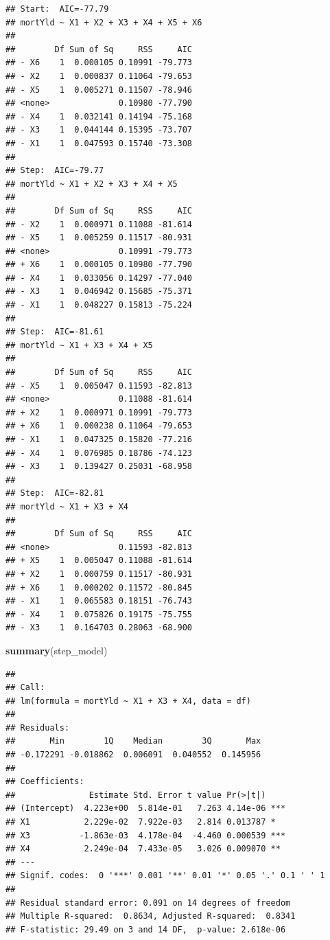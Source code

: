 \documentclass[
  12pt,
]{article}
\newenvironment{Shaded}{\begin{snugshade}}{\end{snugshade}}
\newcommand{\FunctionTok}[1]{\textcolor[rgb]{0.13,0.29,0.53}{\textbf{#1}}}
\newcommand{\NormalTok}[1]{#1}
\begin{document}
\begin{verbatim}
## Start:  AIC=-77.79
## mortYld ~ X1 + X2 + X3 + X4 + X5 + X6
## 
##        Df Sum of Sq     RSS     AIC
## - X6    1  0.000105 0.10991 -79.773
## - X2    1  0.000837 0.11064 -79.653
## - X5    1  0.005271 0.11507 -78.946
## <none>              0.10980 -77.790
## - X4    1  0.032141 0.14194 -75.168
## - X3    1  0.044144 0.15395 -73.707
## - X1    1  0.047593 0.15740 -73.308
## 
## Step:  AIC=-79.77
## mortYld ~ X1 + X2 + X3 + X4 + X5
## 
##        Df Sum of Sq     RSS     AIC
## - X2    1  0.000971 0.11088 -81.614
## - X5    1  0.005259 0.11517 -80.931
## <none>              0.10991 -79.773
## + X6    1  0.000105 0.10980 -77.790
## - X4    1  0.033056 0.14297 -77.040
## - X3    1  0.046942 0.15685 -75.371
## - X1    1  0.048227 0.15813 -75.224
## 
## Step:  AIC=-81.61
## mortYld ~ X1 + X3 + X4 + X5
## 
##        Df Sum of Sq     RSS     AIC
## - X5    1  0.005047 0.11593 -82.813
## <none>              0.11088 -81.614
## + X2    1  0.000971 0.10991 -79.773
## + X6    1  0.000238 0.11064 -79.653
## - X1    1  0.047325 0.15820 -77.216
## - X4    1  0.076985 0.18786 -74.123
## - X3    1  0.139427 0.25031 -68.958
## 
## Step:  AIC=-82.81
## mortYld ~ X1 + X3 + X4
## 
##        Df Sum of Sq     RSS     AIC
## <none>              0.11593 -82.813
## + X5    1  0.005047 0.11088 -81.614
## + X2    1  0.000759 0.11517 -80.931
## + X6    1  0.000202 0.11572 -80.845
## - X1    1  0.065583 0.18151 -76.743
## - X4    1  0.075826 0.19175 -75.755
## - X3    1  0.164703 0.28063 -68.900
\end{verbatim}

\begin{Shaded}
\begin{Highlighting}[]
\FunctionTok{summary}\NormalTok{(step\_model)}
\end{Highlighting}
\end{Shaded}

\begin{verbatim}
## 
## Call:
## lm(formula = mortYld ~ X1 + X3 + X4, data = df)
## 
## Residuals:
##       Min        1Q    Median        3Q       Max 
## -0.172291 -0.018862  0.006091  0.040552  0.145956 
## 
## Coefficients:
##               Estimate Std. Error t value Pr(>|t|)    
## (Intercept)  4.223e+00  5.814e-01   7.263 4.14e-06 ***
## X1           2.229e-02  7.922e-03   2.814 0.013787 *  
## X3          -1.863e-03  4.178e-04  -4.460 0.000539 ***
## X4           2.249e-04  7.433e-05   3.026 0.009070 ** 
## ---
## Signif. codes:  0 '***' 0.001 '**' 0.01 '*' 0.05 '.' 0.1 ' ' 1
## 
## Residual standard error: 0.091 on 14 degrees of freedom
## Multiple R-squared:  0.8634, Adjusted R-squared:  0.8341 
## F-statistic: 29.49 on 3 and 14 DF,  p-value: 2.618e-06
\end{verbatim}
\end{document}
